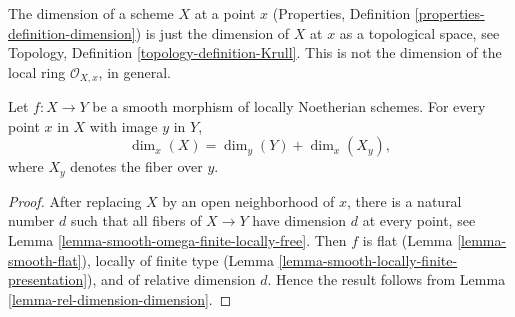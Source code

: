\noindent
The dimension of a scheme $X$ at a point $x$
(Properties, Definition \ref{properties-definition-dimension})
is just the dimension of $X$ at $x$ as a topological space, see
Topology, Definition \ref{topology-definition-Krull}.
This is not the dimension of the local ring $\mathcal{O}_{X,x}$, in general.

\begin{lemma}
\label{lemma-smoothness-dimension}
Let $f : X \to Y$ be a smooth morphism of locally Noetherian schemes.
For every point $x$ in $X$ with image $y$ in $Y$,
$$
\dim_x(X) = \dim_y(Y) + \dim_x(X_y),
$$
where $X_y$ denotes the fiber over $y$.
\end{lemma}

\begin{proof}
After replacing $X$ by an open neighborhood of $x$,
there is a natural number $d$ such that all fibers
of $X \to Y$ have dimension $d$ at every point, see
Lemma \ref{lemma-smooth-omega-finite-locally-free}.
Then $f$ is flat (Lemma \ref{lemma-smooth-flat}),
locally of finite type (Lemma \ref{lemma-smooth-locally-finite-presentation}),
and of relative dimension $d$. Hence the result follows from
Lemma \ref{lemma-rel-dimension-dimension}.
\end{proof}












